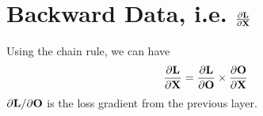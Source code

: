     
    


    
    



\section{Backward Data, i.e. $\frac{\partial \bold{L}}{\partial \bold{X}}$}
Using the chain rule, we can have
\begin{equation}\label{eq:chain_rule_for_X}
  \frac{\partial \bold{L}}{\partial \bold{X}} = \frac{\partial \bold{L}}{\partial \bold{O}} \times \frac{\partial \bold{O}}{\partial \bold{X}}
\end{equation}
$\partial \bold{L}/\partial \bold{O}$ is the loss gradient from the previous layer.



